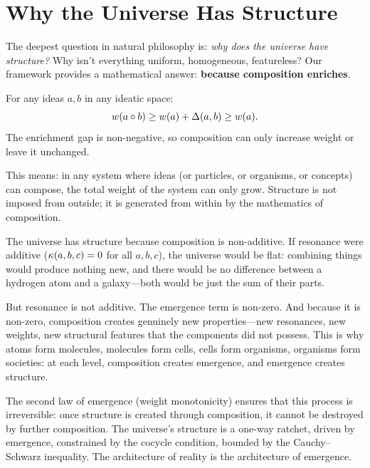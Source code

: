 \section{Why the Universe Has Structure}

The deepest question in natural philosophy is: \emph{why does the universe have
structure?} Why isn't everything uniform, homogeneous, featureless? Our framework
provides a mathematical answer: \textbf{because composition enriches}.

\begin{theorem}
\label{thm:universe-structure}
For any ideas $a, b$ in any ideatic space:
\[
  w(a \circ b) \geq w(a) + \Delta(a,b) \geq w(a).
\]
The enrichment gap is non-negative, so composition can only increase weight
or leave it unchanged.
\end{theorem}

This means: in any system where ideas (or particles, or organisms, or concepts)
can compose, the total weight of the system can only grow. Structure is not
imposed from outside; it is generated from within by the mathematics of composition.

\begin{interpretation}
The universe has structure because composition is non-additive. If resonance were
additive ($\kappa(a,b,c) = 0$ for all $a,b,c$), the universe would be flat:
combining things would produce nothing new, and there would be no difference
between a hydrogen atom and a galaxy---both would be just the sum of their parts.

But resonance is not additive. The emergence term is non-zero. And because it is
non-zero, composition creates genuinely new properties---new resonances, new
weights, new structural features that the components did not possess. This is why
atoms form molecules, molecules form cells, cells form organisms, organisms form
societies: at each level, composition creates emergence, and emergence creates
structure.

The second law of emergence (weight monotonicity) ensures that this process is
irreversible: once structure is created through composition, it cannot be
destroyed by further composition. The universe's structure is a one-way ratchet,
driven by emergence, constrained by the cocycle condition, bounded by the
Cauchy--Schwarz inequality. The architecture of reality is the architecture of
emergence.
\end{interpretation}


